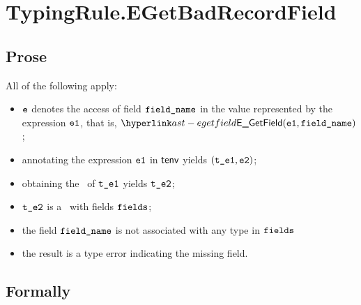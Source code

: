 
\section{TypingRule.EGetBadRecordField \label{sec:TypingRule.EGetBadRecordField}}

\subsection{Prose}
All of the following apply:
\begin{itemize}
  \item $\ve$ denotes the access of field $\fieldname$ in the value represented by the expression $\veone$, that is, $\EGetField(\veone, \fieldname)$;
  \item annotating the expression $\veone$ in $\tenv$ yields $(\vteone, \vetwo)$\ProseOrTypeError;
  \item obtaining the \underlyingtype\ of $\vteone$ yields $\vtetwo$\ProseOrTypeError;
  \item $\vtetwo$ is a \structuredtype\ with fields $\fields$;
  \item the field $\fieldname$ is not associated with any type in $\fields$
  \item the result is a type error indicating the missing field.
\end{itemize}



\subsection{Formally}
\begin{mathpar}
\end{mathpar}

